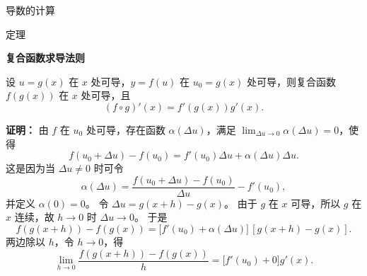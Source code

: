 \documentclass[aspectratio=169,10pt,fontset=fandol]{ctexbeamer}
\newenvironment{warning}{\par\noindent\textbf{注：}\quad}{\par\vspace{0.8em}}
\begin{document}
\begin{frame}[t,fragile]{导数的计算}
\footnotesize
\begin{block}{定理}
{\footnotesize
\textbf{复合函数求导法则}\par

设 $u=g(x)$ 在 $x$ 处可导，$y=f(u)$ 在 $u_0=g(x)$ 处可导，则复合函数 $f(g(x))$ 在 $x$ 处可导，且
\[
(f\circ g)'(x)=f'(g(x))g'(x).
\]

}
\end{block}
\pause
{\footnotesize
\textbf{证明：}
由 $f$ 在 $u_0$ 处可导，存在函数 $\alpha(\Delta u)$，满足 $\lim_{\Delta u\to0}\alpha(\Delta u)=0$，使得
\[
f(u_0+\Delta u)-f(u_0)=f'(u_0)\Delta u+\alpha(\Delta u)\Delta u.
\]
这是因为当 $\Delta u\neq0$ 时可令
\[
\alpha(\Delta u)=\frac{f(u_0+\Delta u)-f(u_0)}{\Delta u}-f'(u_0),
\]
并定义 $\alpha(0)=0$。 令 $\Delta u=g(x+h)-g(x)$。 由于 $g$ 在 $x$ 可导，所以 $g$ 在 $x$ 连续，故 $h\to0$ 时 $\Delta u\to0$。 于是
\[
f(g(x+h))-f(g(x))
=\bigl[f'(u_0)+\alpha(\Delta u)\bigr]\,[g(x+h)-g(x)].
\]
两边除以 $h$，令 $h\to0$，得
\[
\lim_{h\to0}\frac{f(g(x+h))-f(g(x))}{h}
=\bigl[f'(u_0)+0\bigr]g'(x).
\]

}
\end{frame}
\end{document}
